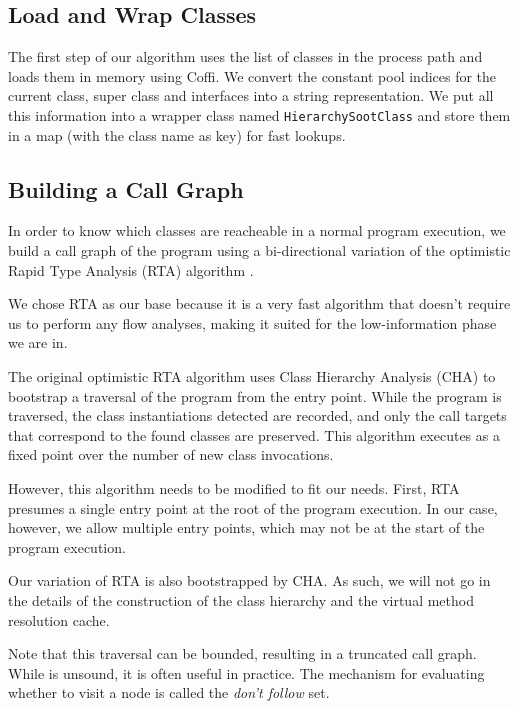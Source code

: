 \documentclass[preprint]{sigplanconf}
\begin{document}
\subsection{Load and Wrap Classes}
\label{sec:loading}
The first step of our algorithm uses the list of classes in the process path and loads them in memory using Coffi. We convert the constant pool indices for the current class, super class and interfaces into a string representation. We put all this information into a wrapper class named {\tt HierarchySootClass} and store them in a map (with the class name as key) for fast lookups.

\subsection{Building a Call Graph}
\label{sec:cg}
In order to know which classes are reacheable in a normal program execution, we build a call graph of the program using a bi-directional variation of the optimistic Rapid Type Analysis (RTA) algorithm \cite{BaconRTA, Sundaresan:2000:PVM:354222.353189}.

We chose RTA as our base because it is a very fast algorithm that doesn't require us to perform any flow analyses, making it suited for the low-information phase we are in.

The original optimistic RTA algorithm uses Class Hierarchy Analysis (CHA) \cite{deanetal} to bootstrap a traversal of the program from the entry point. While the program is traversed, the class instantiations detected are recorded, and only the call targets that correspond to the found classes are preserved. This algorithm executes as a fixed point over the number of new class invocations.

However, this algorithm needs to be modified to fit our needs. First, RTA presumes a single entry point at the root of the program execution. In our case, however, we allow multiple entry points, which may not be at the start of the program execution. %

Our variation of RTA is also bootstrapped by CHA. As such, we will not go in the details of the construction of the class hierarchy and the virtual method resolution cache.

Note that this traversal can be bounded, resulting in a truncated call graph. While is unsound, it is often useful in practice. The mechanism for evaluating whether to visit a node is called the \emph{don't follow} set.
\end{document}
